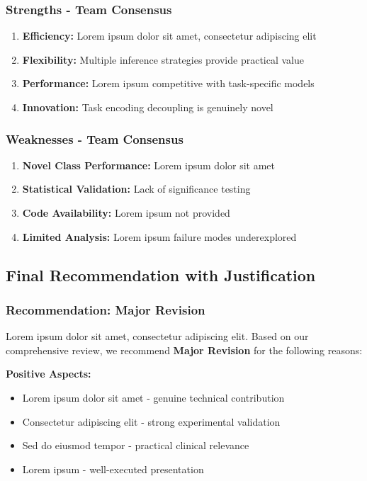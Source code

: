 \subsubsection{Strengths - Team Consensus}
\begin{enumerate}
    \item \textbf{Efficiency:} Lorem ipsum dolor sit amet, consectetur adipiscing elit
    \item \textbf{Flexibility:} Multiple inference strategies provide practical value
    \item \textbf{Performance:} Lorem ipsum competitive with task-specific models
    \item \textbf{Innovation:} Task encoding decoupling is genuinely novel
\end{enumerate}

\subsubsection{Weaknesses - Team Consensus}
\begin{enumerate}
    \item \textbf{Novel Class Performance:} Lorem ipsum dolor sit amet
    \item \textbf{Statistical Validation:} Lack of significance testing
    \item \textbf{Code Availability:} Lorem ipsum not provided
    \item \textbf{Limited Analysis:} Lorem ipsum failure modes underexplored
\end{enumerate}

\subsection{Final Recommendation with Justification}
\subsubsection{Recommendation: Major Revision}

Lorem ipsum dolor sit amet, consectetur adipiscing elit. Based on our comprehensive review, we recommend \textbf{Major Revision} for the following reasons:

\textbf{Positive Aspects:}
\begin{itemize}
    \item Lorem ipsum dolor sit amet - genuine technical contribution
    \item Consectetur adipiscing elit - strong experimental validation
    \item Sed do eiusmod tempor - practical clinical relevance
    \item Lorem ipsum - well-executed presentation
\end{itemize}

